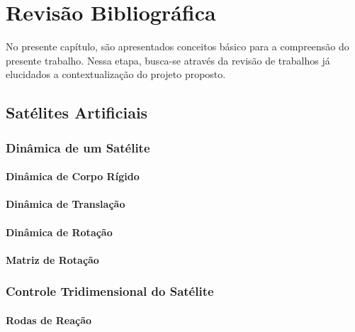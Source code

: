 \chapter{Revisão Bibliográfica}

No presente capítulo, são apresentados conceitos básico para a compreensão do presente trabalho. Nessa etapa, busca-se através da revisão de trabalhos já elucidados a contextualização do projeto proposto.

\section{Satélites Artificiais} %


\subsection{Dinâmica de um Satélite}

\subsubsection{Dinâmica de Corpo Rígido}

\subsubsection{Dinâmica de Translação}

\subsubsection{Dinâmica de Rotação}

\subsubsection{Matriz de Rotação}

\subsection{Controle Tridimensional do Satélite}

\subsubsection{Rodas de Reação}

